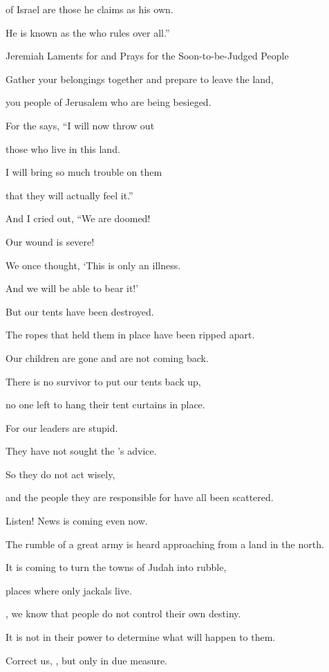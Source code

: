 {of Israel
are those he claims as his own.
\par }{\Q He is known
as the
{}
who rules over all.”
\par }{\SH Jeremiah Laments for and Prays for the Soon-to-be-Judged People
\par }{\Q {}Gather
your belongings
together
and prepare to leave the land,
\par }{\Q you people
of Jerusalem who are being besieged.
\par }{\Q {}For
the
{}
says,
“I
will now
throw
out
\par }{\Q those who live
in this
land.
\par }{\Q I will bring so much
trouble
on them
\par }{\Q that
they
will actually feel it.”
\par }{\Q {}And I cried out, “We are doomed!

\par }{\Q Our wound
is severe!
\par }{\Q We once thought,
‘This
is only
an illness.
\par }{\Q And we will be able to bear it!’
\par }{\Q {}But our tents
have been destroyed.
\par }{\Q The ropes
that held them
in place have
been ripped apart.
\par }{\Q Our children
are gone
and are not
coming back.

\par }{\Q There is no
survivor
to put
our tents
back up,
\par }{\Q no one left
to hang their tent curtains in place.
\par }{\Q {}For
our leaders
are stupid.
\par }{\Q They have not
sought
the
{}’s
advice.

\par }{\Q So
they do not
act wisely,
\par }{\Q and the people
they are responsible for have all
been scattered.
\par }{\Q {}Listen! News
is coming even now.
\par }{\Q The rumble
of a great
army is heard approaching from a land
in the north.
\par }{\Q It is coming
to turn
the towns
of Judah
into rubble,
\par }{\Q places where only
jackals
live.
\par }{\Q {}, we know
that
people
do not
control their own destiny.
\par }{\Q It is not
in their
power
to determine
what will happen to them.
\par }{\Q {}Correct
us,
{}, but only
in due
measure.

}
